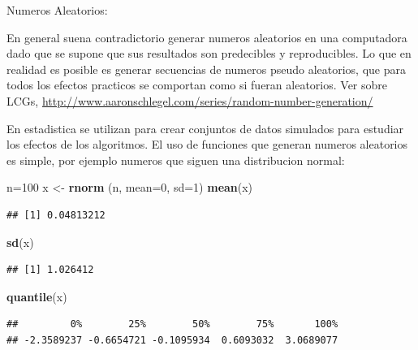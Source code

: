 \documentclass[ignorenonframetext,]{beamer}
\newenvironment{Shaded}{\begin{snugshade}}{\end{snugshade}}
\newcommand{\KeywordTok}[1]{\textcolor[rgb]{0.13,0.29,0.53}{\textbf{#1}}}
\newcommand{\DataTypeTok}[1]{\textcolor[rgb]{0.13,0.29,0.53}{#1}}
\newcommand{\DecValTok}[1]{\textcolor[rgb]{0.00,0.00,0.81}{#1}}
\newcommand{\StringTok}[1]{\textcolor[rgb]{0.31,0.60,0.02}{#1}}
\newcommand{\NormalTok}[1]{#1}
\begin{document}
\begin{frame}[fragile]{Numeros Aleatorios:}

En general suena contradictorio generar numeros aleatorios en una
computadora dado que se supone que sus resultados son predecibles y
reproducibles. Lo que en realidad es posible es generar secuencias de
numeros pseudo aleatorios, que para todos los efectos practicos se
comportan como si fueran aleatorios. Ver sobre LCGs,
\url{http://www.aaronschlegel.com/series/random-number-generation/}

En estadistica se utilizan para crear conjuntos de datos simulados para
estudiar los efectos de los algoritmos. El uso de funciones que generan
numeros aleatorios es simple, por ejemplo numeros que siguen una
distribucion normal:

\begin{Shaded}
\begin{Highlighting}[]
\NormalTok{n=}\DecValTok{100}
\NormalTok{x <-}\StringTok{ }\KeywordTok{rnorm}\NormalTok{ (n, }\DataTypeTok{mean=}\DecValTok{0}\NormalTok{, }\DataTypeTok{sd=}\DecValTok{1}\NormalTok{)}
\KeywordTok{mean}\NormalTok{(x)}
\end{Highlighting}
\end{Shaded}

\begin{verbatim}
## [1] 0.04813212
\end{verbatim}

\begin{Shaded}
\begin{Highlighting}[]
\KeywordTok{sd}\NormalTok{(x)}
\end{Highlighting}
\end{Shaded}

\begin{verbatim}
## [1] 1.026412
\end{verbatim}

\begin{Shaded}
\begin{Highlighting}[]
\KeywordTok{quantile}\NormalTok{(x)}
\end{Highlighting}
\end{Shaded}

\begin{verbatim}
##         0%        25%        50%        75%       100% 
## -2.3589237 -0.6654721 -0.1095934  0.6093032  3.0689077
\end{verbatim}

\end{frame}
\end{document}
